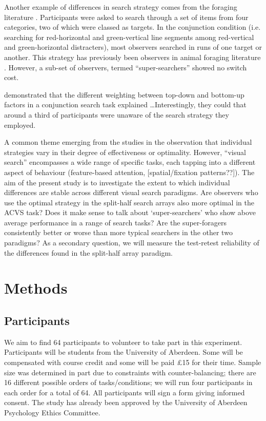 \documentclass[]{rsos}%
\begin{document}
Another example of differences in search strategy comes from the foraging literature \cite{kristjansson2014,johannesson2016}. Participants were asked to search through a set of items from four categories, two of which were classed as targets. In the conjunction condition (i.e. searching for red-horizontal and green-vertical line segments among red-vertical and green-horizontal distracters), most observers searched in runs of one target or another. This strategy has previously been observers in animal foraging literature \cite{dawkins1971}. However, a sub-set of observers, termed ``super-searchers'' showed no switch cost. 


\cite{proulx2011} demonstrated that the different weighting between top-down and bottom-up factors in a conjunction search task explained \ldots Interestingly, they could that around a third of participants were unaware of the search strategy they employed. 

A common theme emerging from the studies in the observation that individual strategies vary in their degree of effectiveness or optimality. However, ``visual search'' encompasses a wide range of specific tasks, each tapping into a different aspect of behaviour (feature-based attention, [spatial/fixation patterns??]). The aim of the present study is to investigate the extent to which individual differences are stable across different visual search paradigms. Are observers who use the optimal strategy in the split-half search arrays also more optimal in the ACVS task? Does it make sense to talk about `super-searchers' who show above average performance in a range of search tasks? Are the super-foragers consistently better or worse than more typical searchers in the other two paradigms? As a secondary question, we will measure the test-retest reliability of the differences found in the split-half array paradigm. 



\section{Methods}


\subsection{Participants}
We aim to find 64 participants to volunteer to take part in this experiment. Participants will be students from the University of Aberdeen. Some will be compensated with course credit and some will be paid \pounds 15 for their time. Sample size was determined in part due to constraints with counter-balancing; there are 16 different possible orders of tasks/conditions; we will run four participants in each order for a total of 64. All participants will sign a form giving informed consent. The study has already been approved by the University of Aberdeen Psychology Ethics Committee.
\end{document}
